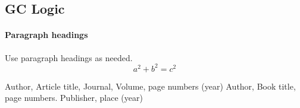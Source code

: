 \subsection{GC Logic}


\paragraph{Paragraph headings} Use paragraph headings as needed.
\begin{equation}
a^2+b^2=c^2
\end{equation}

%
%




\begin{thebibliography}{}
%
%
Author, Article title, Journal, Volume, page numbers (year)
Author, Book title, page numbers. Publisher, place (year)
\end{thebibliography}



